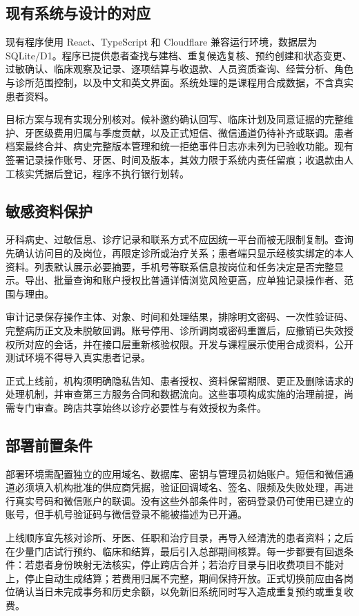 \documentclass[12pt,a4paper,fontset=windows]{ctexart}
\begin{document}
\subsection{现有系统与设计的对应}
现有程序使用 React、TypeScript 和 Cloudflare 兼容运行环境，数据层为 SQLite/D1。程序已提供患者查找与建档、重复候选复核、预约创建和状态变更、过敏确认、临床观察及记录、逐项结算与收退款、人员资质查询、经营分析、角色与诊所范围控制，以及中文和英文界面。系统处理的是课程用合成数据，不含真实患者资料。

目标方案与现有实现分别核对。候补邀约确认回写、临床计划及同意证据的完整维护、牙医级费用归属与季度贡献，以及正式短信、微信通道仍待补齐或联调。患者档案最终合并、病史完整版本管理和统一拒绝事件日志亦未列为已验收功能。现有签署记录操作账号、牙医、时间及版本，其效力限于系统内责任留痕；收退款由人工核实凭据后登记，程序不执行银行划转。

\subsection{敏感资料保护}
牙科病史、过敏信息、诊疗记录和联系方式不应因统一平台而被无限制复制。查询先确认访问目的及岗位，再限定诊所或治疗关系；患者端只显示经核实绑定的本人资料。列表默认展示必要摘要，手机号等联系信息按岗位和任务决定是否完整显示。导出、批量查询和账户授权比普通详情浏览风险更高，应单独记录操作者、范围与理由。

审计记录保存操作主体、对象、时间和处理结果，排除明文密码、一次性验证码、完整病历正文及未脱敏回调。账号停用、诊所调岗或密码重置后，应撤销已失效授权所对应的会话，并在接口层重新核验权限。开发与课程展示使用合成资料，公开测试环境不得导入真实患者记录。

正式上线前，机构须明确隐私告知、患者授权、资料保留期限、更正及删除请求的处理机制，并审查第三方服务合同和数据流向。这些事项构成实施的治理前提，尚需专门审查。跨店共享始终以诊疗必要性与有效授权为条件。

\subsection{部署前置条件}
部署环境需配置独立的应用域名、数据库、密钥与管理员初始账户。短信和微信通道必须填入机构批准的供应商凭据，验证回调域名、签名、限频及失败处理，再进行真实号码和微信账户的联调。没有这些外部条件时，密码登录仍可使用已建立的账号，但手机号验证码与微信登录不能被描述为已开通。

上线顺序宜先核对诊所、牙医、任职和治疗目录，再导入经清洗的患者资料；之后在少量门店试行预约、临床和结算，最后引入总部期间核算。每一步都要有回退条件：若患者身份映射无法核实，停止跨店合并；若治疗目录与旧收费项目不能对上，停止自动生成结算；若费用归属不完整，期间保持开放。正式切换前应由各岗位确认当日未完成事务和历史余额，以免新旧系统同时写入造成重复预约或重复收费。
\end{document}
